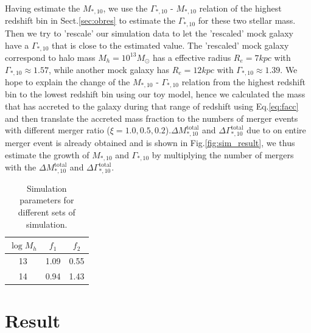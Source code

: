 \documentclass[fleqn,usenatbib]{mnras}
\begin{document}
\par Having estimate the $M_{*,10}$, we use the $\Gamma_{*,10}$ - $M_{*,10}$ relation of the highest redshift bin in Sect.\ref{sec:obres} to estimate the $\Gamma_{*,10}$ for these two stellar mass. Then we try to 'rescale' our simulation data to let the 'rescaled' mock galaxy have a $\Gamma_{*,10}$ that is close to the estimated value.  The 'rescaled' mock galaxy correspond to halo mass $M_h = 10^{13}M_\odot$ has a effective radius $R_e = 7 kpc$ with $\Gamma_{*,10} \approx 1.57$, while another mock galaxy has $R_e = 12kpc$ with $\Gamma_{*,10} \approx 1.39$. We hope to explain the change of the $M_{*,10}$ - $\Gamma_{*,10}$ relation from the highest redshift bin to the lowest redshift bin using our toy model, hence we calculated the mass that has accreted to the galaxy during that range of redshift using Eq.\ref{eq:facc} and then translate the accreted mass fraction to the numbers of merger events with different merger ratio ($\xi = 1.0,0.5,0.2$).$\Delta M_{*,10}^{\text{total}}$ and $\Delta \Gamma_{*,10}^{\text{total}}$ due to on entire merger event is already obtained and is shown in Fig.\ref{fig:sim_result}, we thus estimate the growth of $M_{*,10}$ and $\Gamma_{*,10}$ by multiplying the number of mergers with the $\Delta M_{*,10}^{\text{total}}$ and $\Delta \Gamma_{*,10}^{\text{total}}$. 
\begin{table}
    \centering
    \caption{Simulation parameters for different sets of simulation. }
    \label{tab:facc}
    \begin{tabular}{ccc}
        \hline
        $\log M_h$ & $f_1$ & $f_2$  \\
        \hline
        13& 1.09 & 0.55  \\
        14 & 0.94 & 1.43  \\
        
        \hline
    \end{tabular}
\end{table}
\section{Result}
\end{document}
